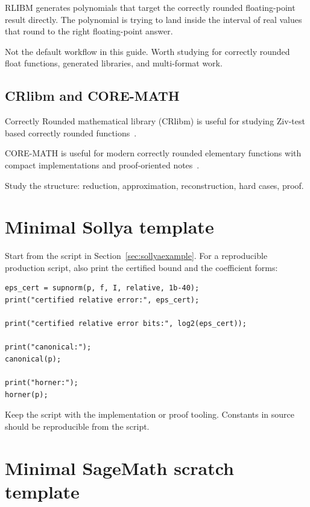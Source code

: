 \documentclass[manuscript, nonacm]{acmart}
\begin{document}
    RLIBM generates polynomials that target the correctly rounded floating-point
    result directly. The polynomial is trying to land inside the interval of
    real values that round to the right floating-point answer.

    Not the default workflow in this guide. Worth studying for correctly
    rounded float functions, generated libraries, and multi-format work.

    \subsection{CRlibm and CORE-MATH}

    Correctly Rounded mathematical library (CRlibm) is useful for studying
    Ziv-test based correctly rounded functions~\cite{crlibm}.

    CORE-MATH is useful for modern correctly rounded elementary functions with
    compact implementations and proof-oriented notes~\cite{coremath}.

    Study the structure: reduction, approximation, reconstruction, hard cases,
    proof.



    \section{Minimal Sollya template}

    Start from the script in Section~\ref{sec:sollyaexample}. For a
    reproducible production script,
    also print the certified bound and the coefficient forms:

    \begin{lstlisting}[style=sollya]
eps_cert = supnorm(p, f, I, relative, 1b-40);
print("certified relative error:", eps_cert);

print("certified relative error bits:", log2(eps_cert));

print("canonical:");
canonical(p);

print("horner:");
horner(p);
    \end{lstlisting}

    Keep the script with the implementation or proof tooling. Constants in
    source should be reproducible from the script.



    \section{Minimal SageMath scratch template}
\end{document}
